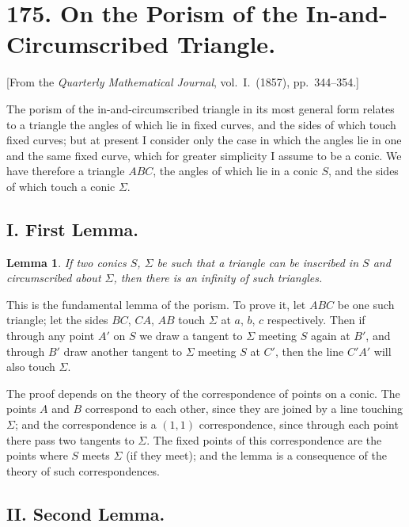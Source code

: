 \documentclass[11pt,a4paper]{book}
\newtheorem*{lemma}{Lemma}
\begin{document}
\newpage
\section*{175. On the Porism of the In-and-Circumscribed Triangle.}

[From the \textit{Quarterly Mathematical Journal}, vol.~I.~(1857), pp.~344--354.]

The porism of the in-and-circumscribed triangle in its most general form relates to a triangle the angles of which lie in fixed curves, and the sides of which touch fixed curves; but at present I consider only the case in which the angles lie in one and the same fixed curve, which for greater simplicity I assume to be a conic. We have therefore a triangle $ABC$, the angles of which lie in a conic $S$, and the sides of which touch a conic $\Sigma$.

\subsection*{I. First Lemma.}

\begin{lemma}
If two conics $S$, $\Sigma$ be such that a triangle can be inscribed in $S$ and circumscribed about $\Sigma$, then there is an infinity of such triangles.
\end{lemma}

This is the fundamental lemma of the porism. To prove it, let $ABC$ be one such triangle; let the sides $BC$, $CA$, $AB$ touch $\Sigma$ at $a$, $b$, $c$ respectively. Then if through any point $A'$ on $S$ we draw a tangent to $\Sigma$ meeting $S$ again at $B'$, and through $B'$ draw another tangent to $\Sigma$ meeting $S$ at $C'$, then the line $C'A'$ will also touch $\Sigma$.

The proof depends on the theory of the correspondence of points on a conic. The points $A$ and $B$ correspond to each other, since they are joined by a line touching $\Sigma$; and the correspondence is a $(1,1)$ correspondence, since through each point there pass two tangents to $\Sigma$. The fixed points of this correspondence are the points where $S$ meets $\Sigma$ (if they meet); and the lemma is a consequence of the theory of such correspondences.

\subsection*{II. Second Lemma.}
\end{document}

